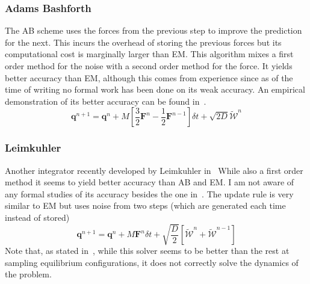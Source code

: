 \documentclass[ twoside,openright,titlepage,numbers=noenddot,%
headinclude,footinclude,cleardoublepage=empty,abstract=on,
BCOR=5mm,paper=b5,fontsize=11pt, dvipsnames
]{scrreprt}
\renewcommand{\vec}[1]{\bm{#1}}
\newcommand{\dt}{\delta t}
\newcommand{\half}{\frac{1}{2}}
\newcommand{\noise}{\widetilde{W}}
\newcommand{\ppos}{q}
\begin{document}
\subsubsection*{Adams Bashforth}
The \gls{AB} scheme uses the forces from the previous step to improve the prediction for the next. This incurs the overhead of storing the previous forces but its computational cost is marginally larger than \gls{EM}. This algorithm mixes a first order method for the noise with a second order method for the force. It yields better accuracy than \gls{EM}, although this comes from experience since as of the time of writing no formal work has been done on its weak accuracy. An empirical demonstration of its better accuracy can be found in~\cite{Balboa2017}.
\begin{equation}
  \vec{\ppos}^{n+1} = \vec{\ppos}^n + M\left[\frac{3}{2}\vec{F}^n - \half \vec{F}^{n-1}\right]\dt + \sqrt{2D}\vec{\mathcal{\noise}}^n
\end{equation}

\subsubsection*{Leimkuhler}
Another integrator recently developed by Leimkuhler in~\cite{Leimkuhler2015}
 While also a first order method it seems to yield better accuracy than \gls{AB} and \gls{EM}. I am not aware of any formal studies of its accuracy besides the one in~\cite{Leimkuhler2014}.
 The update rule is very similar to \gls{EM} but uses noise from two steps (which are generated each time instead of stored)
 \begin{equation}
  \vec{\ppos}^{n+1} = \vec{\ppos}^n + M\vec{F}^n\dt + \sqrt{\frac{D}{2}}\left[\vec{\mathcal{\noise}}^n + \vec{\mathcal{\noise}}^{n-1}\right]
\end{equation}
Note that, as stated in~\cite{Leimkuhler2015}, while this solver seems to be better than the rest at sampling equilibrium configurations, it does not correctly solve the dynamics of the problem.
\end{document}
